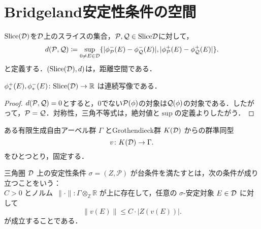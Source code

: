 \section{Bridgeland安定性条件の空間}
\begin{defn}\cite{Bri07}
$\mathrm{Slice(\D)}$を$\D$上のスライスの集合，$\mathcal P,\mathcal Q\in\mathrm{Slice} \D$に対して，
\[d(\mathcal P,\mathcal Q)\coloneq\sup_{0\neq E\in\D}\{|\phi^-_{\P}(E)-\phi_{\Q}^-(E)|,|\phi^+_{\P}(E)-\phi_{\Q}^+(E)|\}.\]
と定義する．$(\mathrm{Slice(\D)},d)$は，距離空間である．
\end{defn}
\begin{lemm}
	$\phi_{*}^+(E),\phi_{*}^-(E)\colon \mathrm{Slice(\D)}\rightarrow\RR$
	は連続写像である．
\end{lemm}
\begin{proof}
	$d(\P,\Q)=0$とすると，$0$でない$\P(\phi)$の対象は$\Q(\phi)$の対象である．したがって，$\P=\Q$．対称性，三角不等式は，絶対値と$\sup$の定義よりしたがう．
\end{proof}

ある有限生成自由アーベル群 $\Gamma$ とGrothendieck群 $K(\D)$ からの群準同型
\[
v \colon K(\D) \to \Gamma .
\]
をひとつとり，固定する．
\begin{defn}\cite{Bri07}
三角圏 $\D$ 上の安定性条件 $\sigma = (Z, \mathcal{P})$ が台条件を満たすとは，次の条件が成り立つことをいう：\\
$C > 0$ とノルム\ $\|\cdot\|\colon\Gamma \otimes_{\mathbb{Z}} \mathbb{R} $ が上に存在して，任意の $\sigma$-安定対象 $E \in \D$ に対して
\[
\|v(E)\| \leq C \cdot |Z(v(E))| .
\]
が成立することである．
\end{defn}

